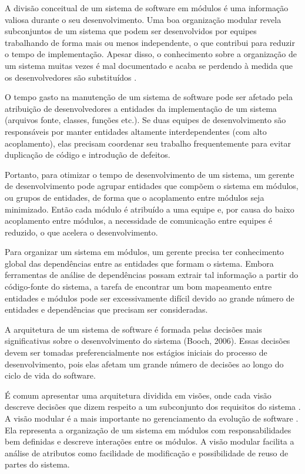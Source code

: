 % 

A divisão conceitual de um sistema de software em módulos é uma informação valiosa durante o seu desenvolvimento. Uma boa organização modular revela subconjuntos de um sistema que podem ser desenvolvidos por equipes trabalhando de forma mais ou menos independente, o que contribui para reduzir o tempo de implementação. Apesar disso, o conhecimento sobre a organização de um sistema muitas vezes é mal documentado e acaba se perdendo à medida que os desenvolvedores são substituídos \cite{Clements2002}.

O tempo gasto na manutenção de um sistema de software pode ser afetado pela atribuição de desenvolvedores a entidades da implementação de um sistema (arquivos fonte, classes, funções etc.). Se duas equipes de desenvolvimento são responsáveis por manter entidades altamente interdependentes (com alto acoplamento), elas precisam coordenar seu trabalho frequentemente para evitar duplicação de código e introdução de defeitos.

Portanto, para otimizar o tempo de desenvolvimento de um sistema, um gerente de desenvolvimento pode agrupar entidades que compõem o sistema em módulos, ou grupos de entidades, de forma que o acoplamento entre módulos seja minimizado. Então cada módulo é atribuído a uma equipe e, por causa do baixo acoplamento entre módulos, a necessidade de comunicação entre equipes é reduzido, o que acelera o desenvolvimento.

Para organizar um sistema em módulos, um gerente precisa ter conhecimento global das dependências entre as entidades que formam o sistema. Embora ferramentas de análise de dependências possam extrair tal informação a partir do código-fonte do sistema, a tarefa de encontrar um bom mapeamento entre entidades e módulos pode ser excessivamente difícil devido ao grande número de entidades e dependências que precisam ser consideradas.


A arquitetura de um sistema de software é formada pelas decisões mais significativas sobre o desenvolvimento do sistema (Booch, 2006). Essas decisões devem ser tomadas preferencialmente nos estágios iniciais do processo de desenvolvimento, pois elas afetam um grande número de decisões ao longo do ciclo de vida do software.

É comum apresentar uma arquitetura dividida em visões, onde cada visão descreve decisões que dizem respeito a um subconjunto dos requisitos do sistema \cite{Clements2002}. A visão modular é a mais importante no gerenciamento da evolução de software \cite{Parnas1972}. Ela representa a organização de um sistema em módulos com responsabilidades bem definidas e descreve interações entre os módulos. A visão modular facilita a análise de atributos como facilidade de modificação e possibilidade de reuso de partes do sistema.

